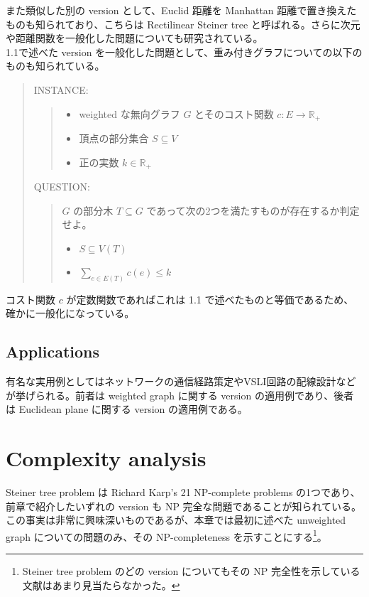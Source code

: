 \documentclass[12pt,uplatex,dvipdfmx,titlepage]{article}
\theoremstyle{case}
\begin{document}
    また類似した別の version として、Euclid 距離を Manhattan 距離で置き換えたものも知られており、こちらは Rectilinear Steiner tree と呼ばれる。さらに次元や距離関数を一般化した問題についても研究されている。\\

    1.1で述べた version を一般化した問題として、重み付きグラフについての以下のものも知られている。

    \begin{quote}
        INSTANCE:
        \begin{quote}
            \begin{itemize}
                \item weighted な無向グラフ $G$ とそのコスト関数 $c: E\rightarrow \mathbb{R_+}$
                \item 頂点の部分集合 $S\subseteq V$
                \item 正の実数 $k\in\mathbb{R_+}$
            \end{itemize}
        \end{quote}

        QUESTION:
        \begin{quote}
            $G$ の部分木 $T\subseteq G$ であって次の2つを満たすものが存在するか判定せよ。
            \begin{itemize}
                \item $S\subseteq V(T)$
                \item $\displaystyle \sum_{e\in E(T)} c(e)\le k$
            \end{itemize}
        \end{quote}
    \end{quote}
    コスト関数 $c$ が定数関数であればこれは 1.1 で述べたものと等価であるため、確かに一般化になっている。

    \subsection{Applications}
    有名な実用例としてはネットワークの通信経路策定やVSLI回路の配線設計などが挙げられる。前者は weighted graph に関する version の適用例であり、後者は Euclidean plane に関する version の適用例である。

    \section{Complexity analysis}
    Steiner tree problem は Richard Karp's 21 NP-complete problems\cite{karp} の1つであり、前章で紹介したいずれの version も NP 完全な問題であることが知られている\cite{np}。
    この事実は非常に興味深いものであるが、本章では最初に述べた unweighted graph についての問題のみ、その NP-completeness を示すことにする\footnote{Steiner tree problem のどの version についてもその NP 完全性を示している文献はあまり見当たらなかった。}。
\end{document}
